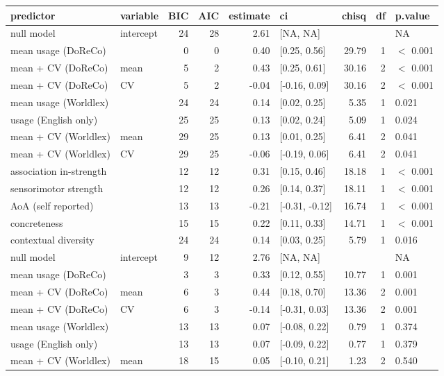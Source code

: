 \begin{table}[ht]
\centering
\begin{tabular}{llrrrlrrl}
  \hline
predictor & variable & BIC & AIC & estimate & ci & chisq & df & p.value \\ 
  \hline
null model & intercept & 24 & 28 & 2.61 & [NA, NA] &  &  & NA \\ 
  mean usage (DoReCo) &  & 0 & 0 & 0.40 & [0.25, 0.56] & 29.79 & 1 & $<$ 0.001 \\ 
  mean + CV (DoReCo) & mean & 5 & 2 & 0.43 & [0.25, 0.61] & 30.16 & 2 & $<$ 0.001 \\ 
  mean + CV (DoReCo) & CV & 5 & 2 & -0.04 & [-0.16, 0.09] & 30.16 & 2 & $<$ 0.001 \\ 
  mean usage (Worldlex) &  & 24 & 24 & 0.14 & [0.02, 0.25] & 5.35 & 1 & 0.021 \\ 
  usage (English only) &  & 25 & 25 & 0.13 & [0.02, 0.24] & 5.09 & 1 & 0.024 \\ 
  mean + CV (Worldlex) & mean & 29 & 25 & 0.13 & [0.01, 0.25] & 6.41 & 2 & 0.041 \\ 
  mean + CV (Worldlex) & CV & 29 & 25 & -0.06 & [-0.19, 0.06] & 6.41 & 2 & 0.041 \\ 
  association in-strength &  & 12 & 12 & 0.31 & [0.15, 0.46] & 18.18 & 1 & $<$ 0.001 \\ 
  sensorimotor strength &  & 12 & 12 & 0.26 & [0.14, 0.37] & 18.11 & 1 & $<$ 0.001 \\ 
  AoA (self reported) &  & 13 & 13 & -0.21 & [-0.31, -0.12] & 16.74 & 1 & $<$ 0.001 \\ 
  concreteness &  & 15 & 15 & 0.22 & [0.11, 0.33] & 14.71 & 1 & $<$ 0.001 \\ 
  contextual diversity &  & 24 & 24 & 0.14 & [0.03, 0.25] & 5.79 & 1 & 0.016 \\ 
  null model & intercept & 9 & 12 & 2.76 & [NA, NA] &  &  & NA \\ 
  mean usage (DoReCo) &  & 3 & 3 & 0.33 & [0.12, 0.55] & 10.77 & 1 & 0.001 \\ 
  mean + CV (DoReCo) & mean & 6 & 3 & 0.44 & [0.18, 0.70] & 13.36 & 2 & 0.001 \\ 
  mean + CV (DoReCo) & CV & 6 & 3 & -0.14 & [-0.31, 0.03] & 13.36 & 2 & 0.001 \\ 
  mean usage (Worldlex) &  & 13 & 13 & 0.07 & [-0.08, 0.22] & 0.79 & 1 & 0.374 \\ 
  usage (English only) &  & 13 & 13 & 0.07 & [-0.09, 0.22] & 0.77 & 1 & 0.379 \\ 
  mean + CV (Worldlex) & mean & 18 & 15 & 0.05 & [-0.10, 0.21] & 1.23 & 2 & 0.540 \\ 

\end{tabular}
\end{table}
